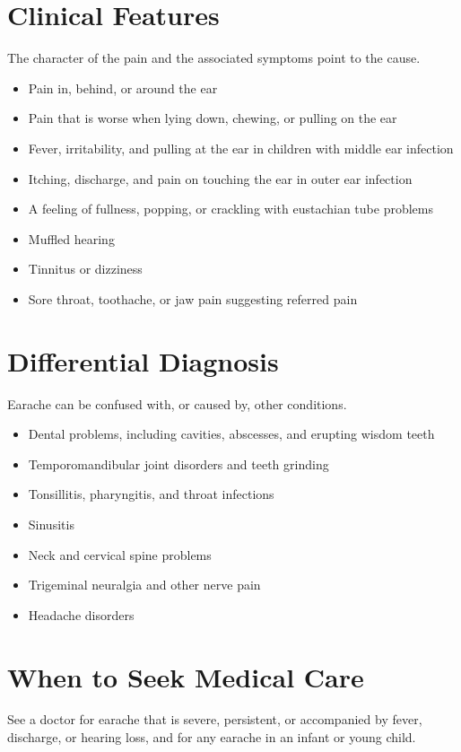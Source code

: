 \section*{Clinical Features}
The character of the pain and the associated symptoms point to the cause.
\begin{itemize}
    \item Pain in, behind, or around the ear
    \item Pain that is worse when lying down, chewing, or pulling on the ear
    \item Fever, irritability, and pulling at the ear in children with middle ear infection
    \item Itching, discharge, and pain on touching the ear in outer ear infection
    \item A feeling of fullness, popping, or crackling with eustachian tube problems
    \item Muffled hearing
    \item Tinnitus or dizziness
    \item Sore throat, toothache, or jaw pain suggesting referred pain
\end{itemize}

\section*{Differential Diagnosis}
Earache can be confused with, or caused by, other conditions.
\begin{itemize}
    \item Dental problems, including cavities, abscesses, and erupting wisdom teeth
    \item Temporomandibular joint disorders and teeth grinding
    \item Tonsillitis, pharyngitis, and throat infections
    \item Sinusitis
    \item Neck and cervical spine problems
    \item Trigeminal neuralgia and other nerve pain
    \item Headache disorders
\end{itemize}

\section*{When to Seek Medical Care}
See a doctor for earache that is severe, persistent, or accompanied by fever, discharge, or hearing loss, and for any earache in an infant or young child.

